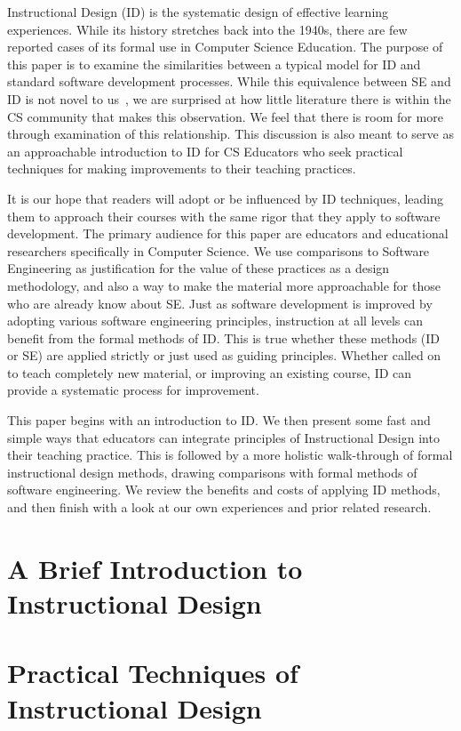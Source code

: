 
Instructional Design (ID) is the systematic design of effective learning experiences.
While its history stretches back into the 1940s, there are few reported cases of its formal use in Computer Science Education.
The purpose of this paper is to examine the similarities between a typical model for ID and standard software development processes.
While this equivalence between SE and ID is not novel to us~\citep{east2004applying}, we are surprised at how little literature there is within the CS community that makes this observation.
We feel that there is room for more through examination of this relationship.
This discussion is also meant to serve as an approachable introduction to ID for CS Educators who seek practical techniques for making improvements to their teaching practices.

It is our hope that readers will adopt or be influenced by ID techniques, leading them to approach their courses with the same rigor that they apply to software development.
The primary audience for this paper are educators and educational researchers specifically in Computer Science.
We use comparisons to Software Engineering as justification for the value of these practices as a design methodology, and also a way to make the material more approachable for those who are already know about SE.
Just as software development is improved by adopting various software engineering principles, instruction at all levels can benefit from the formal methods of ID.
This is true whether these methods (ID or SE) are applied strictly or just used as guiding principles.
Whether called on to teach completely new material, or improving an existing course, ID can provide a systematic process for improvement.

This paper begins with an introduction to ID.
We then present some fast and simple ways that educators can integrate principles of Instructional Design into their teaching practice. 
This is followed by a more holistic walk-through of formal instructional design methods, drawing comparisons with formal methods of software engineering.
We review the benefits and costs of applying ID methods, and then finish with a look at our own experiences and prior related research. 


\section{A Brief Introduction to Instructional Design}



\section{Practical Techniques of Instructional Design}

